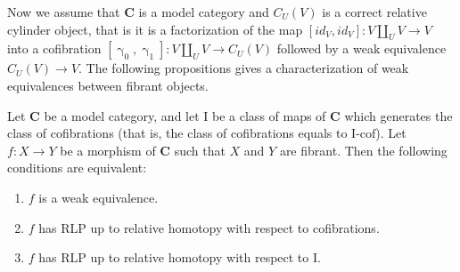 \documentclass{tac}
\theoremstyle{definition}
\newcommand{\cat}[1]{\mathbf{#1}}
\newcommand{\C}{\cat{C}}
\newcommand{\I}{\mathrm{I}}
\newcommand{\class}[2]{#1\text{-}\mathrm{#2}}
\newcommand{\Icof}[1][\I]{\class{#1}{cof}}
\newcommand{\cyli}{\upgamma}
\begin{document}
Now we assume that $\C$ is a model category and $C_U(V)$ is a correct relative cylinder object, that is it is a factorization of the map $[id_V,id_V] : V \amalg_U V \to V$
into a cofibration $[\cyli_0,\cyli_1] : V \amalg_U V \to C_U(V)$ followed by a weak equivalence $C_U(V) \to V$.
The following propositions gives a characterization of weak equivalences between fibrant objects.

\begin{prop}[min-we]
Let $\C$ be a model category, and let $\I$ be a class of maps of $\C$ which generates the class of cofibrations (that is, the class of cofibrations equals to $\Icof$).
Let $f : X \to Y$ be a morphism of $\C$ such that $X$ and $Y$ are fibrant.
Then the following conditions are equivalent:
\begin{enumerate}
\item $f$ is a weak equivalence.
\item $f$ has RLP up to relative homotopy with respect to cofibrations.
\item $f$ has RLP up to relative homotopy with respect to $\I$.
\end{enumerate}
\end{prop}
\end{document}
